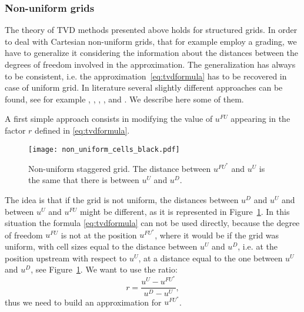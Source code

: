 \subsubsection{Non-uniform grids}
The theory of TVD methods presented above holds for structured grids. In order 
to deal with Cartesian non-uniform grids, that for example employ a grading, we 
have to generalize it considering the information about the distances between 
the degrees of freedom involved in the approximation. The generalization has 
always to be consistent, i.e. the approximation~\eqref{eq:tvdformula} has to be 
recovered in case of uniform grid. In literature several slightly different 
approaches can be found, see for example \cite{nonunif:bruner}, 
\cite{nonunif:darmou}, \cite{nonunif:li}, \cite{nonunif:berger}, 
\cite{nonunif:hou} and \cite{nonunif:zeng}. We describe here some of them.

A first simple approach consists in modifying the value of $u^{FU}$ appearing 
in the factor $r$ defined in \eqref{eq:tvdformula}.
\begin{figure}
	\centering
	\texttt{[image: non\_uniform\_cells\_black.pdf]}
	\caption[Non-uniform staggered grid]{Non-uniform staggered grid. The 
	distance between $u^{FU^*}$ and $u^U$ is the same that there is between 
	$u^U$ and $u^D$.}
	\label{fig:nonunifli}
\end{figure}

The idea is that if the grid is not uniform, the distances between $u^D$ and 
$u^U$ and between $u^U$ and $u^{FU}$ might be different, as it is represented 
in Figure~\ref{fig:nonunifli}. In this situation the formula 
\eqref{eq:tvdformula} can not be used directly, because the degree of freedom 
$u^{FU}$ is not at the position 
$u^{FU^*}$, where it would be if the grid was uniform, with cell sizes equal to 
the distance between $u^U$ and $u^D$, i.e. at the position upstream with 
respect to $u^U$, at a distance equal to the one between $u^U$ and $u^D$, see 
Figure~\ref{fig:nonunifli}. We want to use the ratio:
\begin{equation*}
r = \frac{u^U - u^{FU^*}}{u^D - u^U},
\end{equation*}
thus we need to build an approximation for $u^{FU^*}$.

